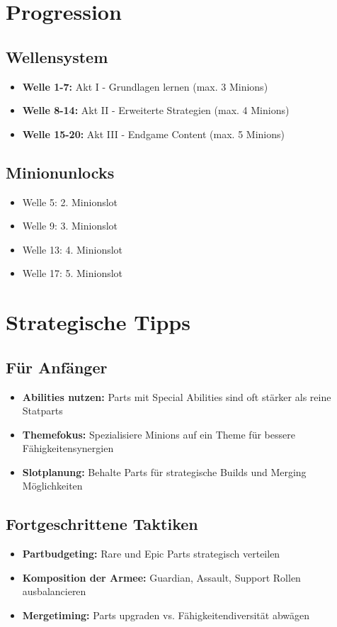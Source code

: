 \documentclass[12pt,a4paper]{article}
\begin{document}
\section{Progression}

\subsection{Wellensystem}
\begin{itemize}
    \item \textbf{Welle 1-7:} Akt I - Grundlagen lernen (max. 3 Minions)
    \item \textbf{Welle 8-14:} Akt II - Erweiterte Strategien (max. 4 Minions)
    \item \textbf{Welle 15-20:} Akt III - Endgame Content (max. 5 Minions)
\end{itemize}

\subsection{Minionunlocks}
\begin{itemize}
    \item Welle 5: 2. Minionslot
    \item Welle 9: 3. Minionslot
    \item Welle 13: 4. Minionslot
    \item Welle 17: 5. Minionslot
\end{itemize}

\section{Strategische Tipps}

\subsection{Für Anfänger}
\begin{itemize}
    \item \textbf{Abilities nutzen:} Parts mit Special Abilities sind oft stärker als reine Statparts
    \item \textbf{Themefokus:} Spezialisiere Minions auf ein Theme für bessere Fähigkeitensynergien
    \item \textbf{Slotplanung:} Behalte Parts für strategische Builds und Merging Möglichkeiten
\end{itemize}

\subsection{Fortgeschrittene Taktiken}
\begin{itemize}
    \item \textbf{Partbudgeting:} Rare und Epic Parts strategisch verteilen
    \item \textbf{Komposition der Armee:} Guardian, Assault, Support Rollen ausbalancieren
    \item \textbf{Mergetiming:} Parts upgraden vs. Fähigkeitendiversität abwägen
\end{itemize}
\end{document}
